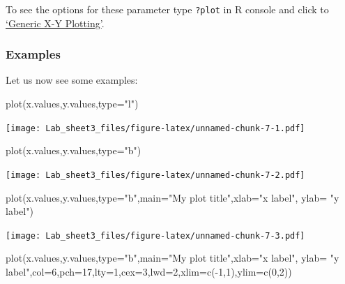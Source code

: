 \documentclass[
]{article}
\newenvironment{Shaded}{\begin{snugshade}}{\end{snugshade}}
\newcommand{\AttributeTok}[1]{\textcolor[rgb]{0.77,0.63,0.00}{#1}}
\newcommand{\DecValTok}[1]{\textcolor[rgb]{0.00,0.00,0.81}{#1}}
\newcommand{\FunctionTok}[1]{\textcolor[rgb]{0.00,0.00,0.00}{#1}}
\newcommand{\NormalTok}[1]{#1}
\newcommand{\SpecialCharTok}[1]{\textcolor[rgb]{0.00,0.00,0.00}{#1}}
\newcommand{\StringTok}[1]{\textcolor[rgb]{0.31,0.60,0.02}{#1}}
\theoremstyle{remark}
\begin{document}
To see the options for these parameter type \texttt{?plot} in R console
and click to
\href{https://stat.ethz.ch/R-manual/R-devel/library/base/html/plot.html}{`Generic X-Y Plotting'}.

\hypertarget{examples}{%
\subsubsection{Examples}\label{examples}}

Let us now see some examples:

\begin{Shaded}
\begin{Highlighting}[]
\FunctionTok{plot}\NormalTok{(x.values,y.values,}\AttributeTok{type=}\StringTok{"l"}\NormalTok{)}
\end{Highlighting}
\end{Shaded}

\texttt{[image: Lab\_sheet3\_files/figure-latex/unnamed-chunk-7-1.pdf]}

\begin{Shaded}
\begin{Highlighting}[]
\FunctionTok{plot}\NormalTok{(x.values,y.values,}\AttributeTok{type=}\StringTok{"b"}\NormalTok{)}
\end{Highlighting}
\end{Shaded}

\texttt{[image: Lab\_sheet3\_files/figure-latex/unnamed-chunk-7-2.pdf]}

\begin{Shaded}
\begin{Highlighting}[]
\FunctionTok{plot}\NormalTok{(x.values,y.values,}\AttributeTok{type=}\StringTok{"b"}\NormalTok{,}\AttributeTok{main=}\StringTok{"My plot title"}\NormalTok{,}\AttributeTok{xlab=}\StringTok{"x label"}\NormalTok{,}
\AttributeTok{ylab=} \StringTok{"y label"}\NormalTok{)}
\end{Highlighting}
\end{Shaded}

\texttt{[image: Lab\_sheet3\_files/figure-latex/unnamed-chunk-7-3.pdf]}

\begin{Shaded}
\begin{Highlighting}[]
\FunctionTok{plot}\NormalTok{(x.values,y.values,}\AttributeTok{type=}\StringTok{"b"}\NormalTok{,}\AttributeTok{main=}\StringTok{"My plot title"}\NormalTok{,}\AttributeTok{xlab=}\StringTok{"x label"}\NormalTok{,}
\AttributeTok{ylab=} \StringTok{"y label"}\NormalTok{,}\AttributeTok{col=}\DecValTok{6}\NormalTok{,}\AttributeTok{pch=}\DecValTok{17}\NormalTok{,}\AttributeTok{lty=}\DecValTok{1}\NormalTok{,}\AttributeTok{cex=}\DecValTok{3}\NormalTok{,}\AttributeTok{lwd=}\DecValTok{2}\NormalTok{,}\AttributeTok{xlim=}\FunctionTok{c}\NormalTok{(}\SpecialCharTok{{-}}\DecValTok{1}\NormalTok{,}\DecValTok{1}\NormalTok{),}\AttributeTok{ylim=}\FunctionTok{c}\NormalTok{(}\DecValTok{0}\NormalTok{,}\DecValTok{2}\NormalTok{))}
\end{Highlighting}
\end{Shaded}
\end{document}
